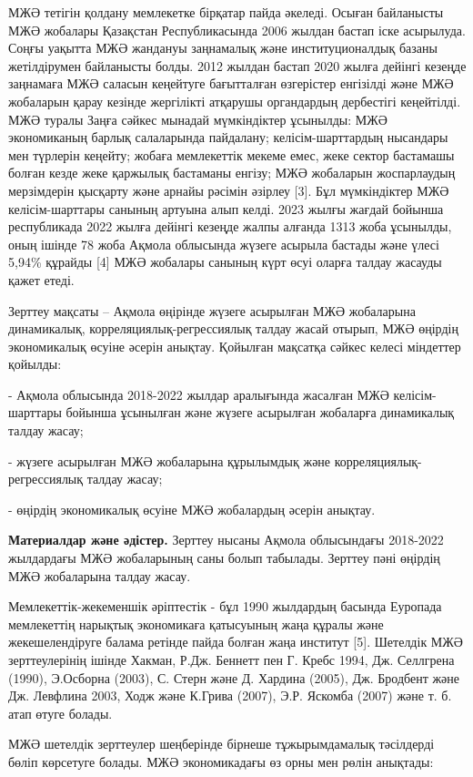 \begin{multicols}{2}
МЖӘ тетігін қолдану мемлекетке бірқатар пайда әкеледі. Осыған байланысты
МЖӘ жобалары Қазақстан Республикасында 2006 жылдан бастап іске
асырылуда. Соңғы уақытта МЖӘ жандануы заңнамалық және институционалдық
базаны жетілдірумен байланысты болды. 2012 жылдан бастап 2020 жылға
дейінгі кезеңде заңнамаға МЖӘ саласын кеңейтуге бағытталған өзгерістер
енгізілді және МЖӘ жобаларын қарау кезінде жергілікті атқарушы
органдардың дербестігі кеңейтілді. МЖӘ туралы Заңға сәйкес мынадай
мүмкіндіктер ұсынылды: МЖӘ экономиканың барлық салаларында пайдалану;
келісім-шарттардың нысандары мен түрлерін кеңейту; жобаға мемлекеттік
мекеме емес, жеке сектор бастамашы болған кезде жеке қаржылық бастаманы
енгізу; МЖӘ жобаларын жоспарлаудың мерзімдерін қысқарту және арнайы
рәсімін әзірлеу {[}3{]}. Бұл мүмкіндіктер МЖӘ келісім-шарттары санының
артуына алып келді. 2023 жылғы жағдай бойынша республикада 2022 жылға
дейінгі кезеңде жалпы алғанда 1313 жоба ұсынылды, оның ішінде 78 жоба
Ақмола облысында жүзеге асырыла бастады және үлесі 5,94\% құрайды
{[}4{]} МЖӘ жобалары санының күрт өсуі оларға талдау жасауды қажет
етеді.

Зерттеу мақсаты -- Ақмола өңірінде жүзеге асырылған МЖӘ жобаларына
динамикалық, корреляциялық-регрессиялық талдау жасай отырып, МЖӘ өңірдің
экономикалық өсуіне әсерін анықтау. Қойылған мақсатқа сәйкес келесі
міндеттер қойылды:

- Ақмола облысында 2018-2022 жылдар аралығында жасалған МЖӘ
келісім-шарттары бойынша ұсынылған және жүзеге асырылған жобаларға
динамикалық талдау жасау;

- жүзеге асырылған МЖӘ жобаларына құрылымдық және
корреляциялық-регрессиялық талдау жасау;

- өңірдің экономикалық өсуіне МЖӘ жобалардың әсерін анықтау.

{\bfseries Материалдар және әдістер.} Зерттеу нысаны Ақмола облысындағы
2018-2022 жылдардағы МЖӘ жобаларының саны болып табылады. Зерттеу пәні
өңірдің МЖӘ жобаларына талдау жасау.

Мемлекеттік-жекеменшік әріптестік - бұл 1990 жылдардың басында Еуропада
мемлекеттің нарықтық экономикаға қатысуының жаңа құралы және
жекешелендіруге балама ретінде пайда болған жаңа институт {[}5{]}.
Шетелдік МЖӘ зерттеулерінің ішінде Хакман, Р.Дж. Беннетт пен Г. Кребс
1994, Дж. Селлгрена (1990), Э.Осборна (2003), С. Стерн және Д. Хардина
(2005), Дж. Бродбент және Дж. Левфлина 2003, Ходж және К.Грива (2007),
Э.Р. Яскомба (2007) және т. б. атап өтуге болады.~

МЖӘ шетелдік зерттеулер шеңберінде бірнеше тұжырымдамалық тәсілдерді
бөліп көрсетуге болады. МЖӘ экономикадағы өз орны мен рөлін анықтады:


\end{multicols}
